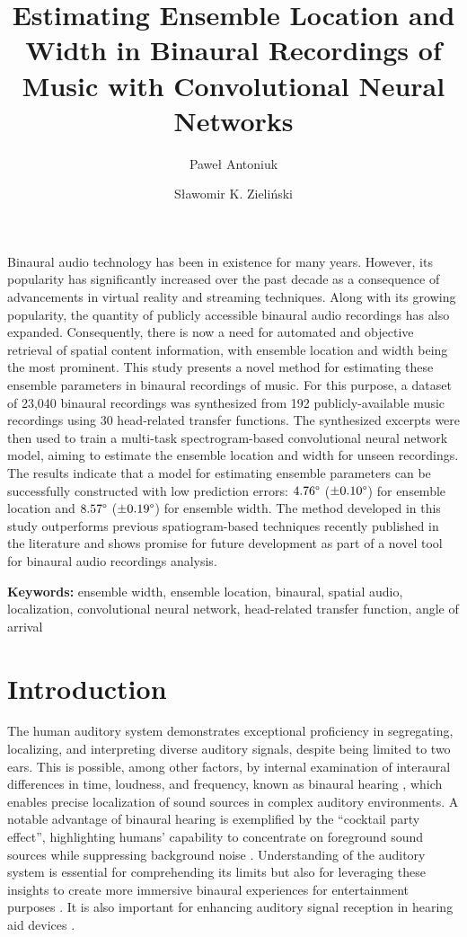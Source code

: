 \documentclass[11pt]{article}
\title{Estimating Ensemble Location and Width in Binaural Recordings of Music with Convolutional Neural Networks}
\author[1,*]{Paweł Antoniuk\orcidlink{0000-0002-0914-8920}}
\author[1]{Sławomir K. Zieliński\orcidlink{0000-0002-3205-974X}}
\affil[1]{Faculty of Computer Science, Białystok University of Technology \protect\\ Wiejska 45A, 15-351 Białystok, Poland}
\affil[*]{Corresponding Author Email: pawel.antoniuk@sd.pb.edu.pl}
\date{}
\renewenvironment{abstract}{}{}
\newcommand{\keywords}[1]{
  \noindent\begin{center}\begin{minipage}{\textwidth}
  \small\textbf{Keywords:} #1
  \end{minipage}\end{center}
}
\begin{document}
\maketitle

\begin{abstract}
  Binaural audio technology has been in existence for many years. However, its popularity has significantly increased over the past decade as a consequence of advancements in virtual reality and streaming techniques. Along with its growing popularity, the quantity of publicly accessible binaural audio recordings has also expanded. Consequently, there is now a need for automated and objective retrieval of spatial content information, with ensemble location and width being the most prominent. This study presents a novel method for estimating these ensemble parameters in binaural recordings of music. For this purpose, a dataset of 23,040 binaural recordings was synthesized from 192 publicly-available music recordings using 30 head-related transfer functions. The synthesized excerpts were then used to train a multi-task spectrogram-based convolutional neural network model, aiming to estimate the ensemble location and width for unseen recordings. The results indicate that a model for estimating ensemble parameters can be successfully constructed with low prediction errors: $4.76\degree$ ($\pm0.10\degree$) for ensemble location and $8.57\degree$ ($\pm0.19\degree$) for ensemble width. The method developed in this study outperforms previous spatiogram-based techniques recently published in the literature and shows promise for future development as part of a novel tool for binaural audio recordings analysis.
\end{abstract}

\keywords{ensemble width, ensemble location, binaural, spatial audio, localization, convolutional neural network, head-related transfer function, angle of arrival}

\section{Introduction}

The human auditory system demonstrates exceptional proficiency in segregating, localizing, and interpreting diverse auditory signals, despite being limited to two ears. This is possible, among other factors, by internal examination of interaural differences in time, loudness, and frequency, known as binaural hearing \parencite{blauert_spatial_1996}, which enables precise localization of sound sources in complex auditory environments. A notable advantage of binaural hearing is exemplified by the ``cocktail party effect'', highlighting humans' capability to concentrate on foreground sound sources while suppressing background noise \parencite{cherry_experiments_1953}. Understanding of the auditory system is essential for comprehending its limits but also for leveraging these insights to create more immersive binaural experiences for entertainment purposes \parencite{zhang_surround_2017}. It is also important for enhancing auditory signal reception in hearing aid devices \parencite{hirsh_binaural_1950, thiemann_speech_2016}.
\end{document}
